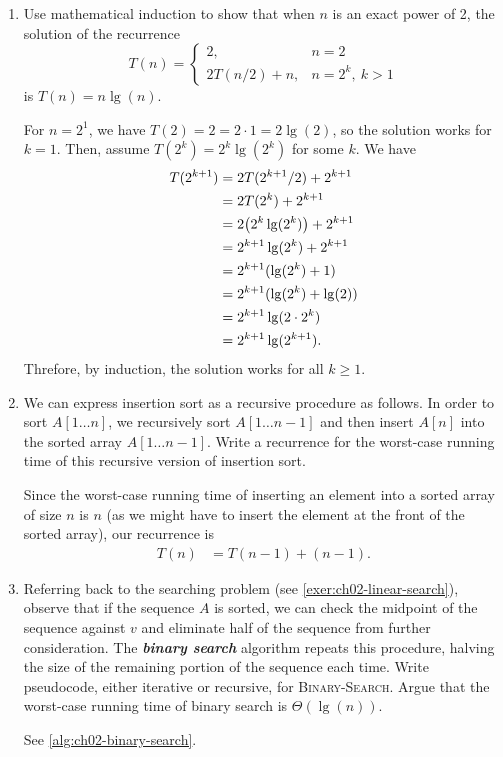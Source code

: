\documentclass[Chapter02]{subfiles}
\begin{document}
\begin{enumerate}
		\item Use mathematical induction to show that when $n$ is an exact power of 2, the solution of the recurrence
		\[
			T(n) = 
			\begin{cases}
				2, & n = 2\\
				2T(n / 2) + n, & n = 2^k,\ k > 1
			\end{cases}
		\]
		is $T(n) = n\lg(n)$.
		\begin{answer}
			For $n = 2^1$, we have $T(2) = 2 = 2 \cdot 1 = 2 \lg(2)$, so the solution works for $k = 1$. Then, assume $T(2^k) = 2^k \lg(2^k)$ for some $k$. We have
			\begin{align*}
				T(2^{k + 1}) &= 2T(2^{k+1} / 2) + 2^{k + 1}\\
					&=  2T(2^k) + 2^{k + 1}\\
					&= 2\qty(2^k \lg(2^k)) + 2^{k + 1}\\
					&= 2^{k + 1} \lg(2^k) + 2^{k + 1}\\
					&= 2^{k + 1}(\lg(2^k) + 1)\\
					&= 2^{k + 1}(\lg(2^k) + \lg(2))\\
					&= 2^{k + 1}\lg(2 \cdot 2^k)\\
					&= 2^{k + 1}\lg(2^{k + 1}).
			\end{align*}
			Threfore, by induction, the solution works for all $k \geq 1$.
		\end{answer}

		\item We can express insertion sort as a recursive procedure as follows. In order to sort $A[1 \dots n]$, we recursively sort $A[1 \dots n-1]$ and then insert $A[n]$ into the sorted array $A[1 \dots n-1]$. Write a recurrence for the worst-case running time of this recursive version of insertion sort.
		\begin{answer}
			Since the worst-case running time of inserting an element into a sorted array of size $n$ is $n$ (as we might have to insert the element at the front of the sorted array), our recurrence is
			\begin{align*}
				T(n) &= T(n - 1) + (n - 1).
			\end{align*}
		\end{answer}

		\item \label{exer:ch02-binary-search} Referring back to the searching problem (see \cref{exer:ch02-linear-search}), observe that if the sequence $A$ is sorted, we can check the midpoint of the sequence against $v$ and eliminate half of the sequence from further consideration. The \textbf{\textit{binary search}} algorithm repeats this procedure, halving the size of the remaining portion of the sequence each time. Write pseudocode, either iterative or recursive, for \textsc{Binary-Search}. Argue that the worst-case running time of binary search is $\Theta(\lg(n))$.
		\begin{answer}
			See \autoref{alg:ch02-binary-search}.


\end{answer}
\end{enumerate}
\end{document}
